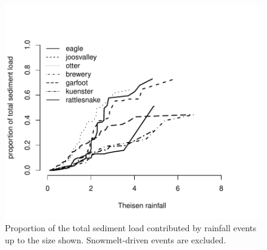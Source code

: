 \documentclass[12pt]{article}
\begin{document}






\begin{figure}
    \begin{center}
\includegraphics{loadings-figure2}
    \end{center}
    \caption{Proportion of the total sediment load contributed by rainfall events up to the size shown. Snowmelt-driven events are excluded.\label{cdf-p}}
\end{figure}
\end{document}
